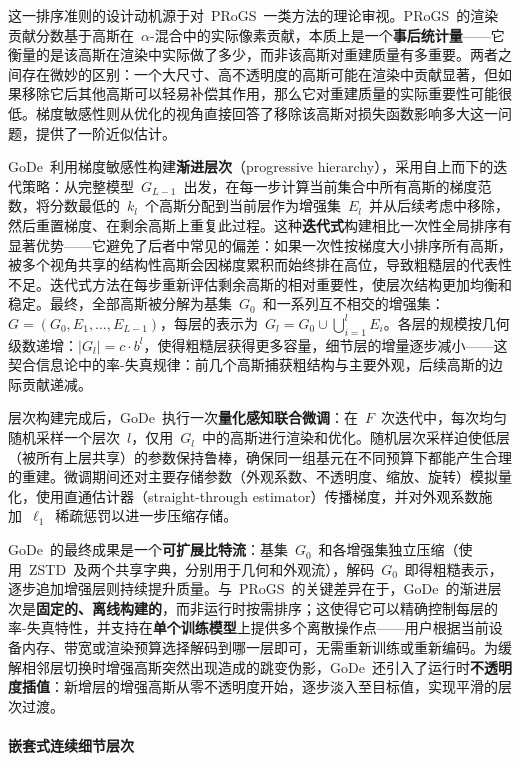 这一排序准则的设计动机源于对~PRoGS~一类方法的理论审视。PRoGS~的渲染贡献分数基于高斯在~$\alpha$-混合中的实际像素贡献，本质上是一个\textbf{事后统计量}——它衡量的是该高斯在渲染中实际做了多少，而非该高斯对重建质量有多重要。两者之间存在微妙的区别：一个大尺寸、高不透明度的高斯可能在渲染中贡献显著，但如果移除它后其他高斯可以轻易补偿其作用，那么它对重建质量的实际重要性可能很低。梯度敏感性则从优化的视角直接回答了移除该高斯对损失函数影响多大这一问题，提供了一阶近似估计。

GoDe~利用梯度敏感性构建\textbf{渐进层次}（progressive hierarchy），采用自上而下的迭代策略：从完整模型~$G_{L-1}$~出发，在每一步计算当前集合中所有高斯的梯度范数，将分数最低的~$k_l$~个高斯分配到当前层作为增强集~$E_l$~并从后续考虑中移除，然后重置梯度、在剩余高斯上重复此过程。这种\textbf{迭代式}构建相比一次性全局排序有显著优势——它避免了后者中常见的偏差：如果一次性按梯度大小排序所有高斯，被多个视角共享的结构性高斯会因梯度累积而始终排在高位，导致粗糙层的代表性不足。迭代式方法在每步重新评估剩余高斯的相对重要性，使层次结构更加均衡和稳定。最终，全部高斯被分解为基集~$G_0$~和一系列互不相交的增强集：$G = (G_0, E_1, \ldots, E_{L-1})$，每层的表示为~$G_l = G_0 \cup \bigcup_{i=1}^{l} E_i$。各层的规模按几何级数递增：$|G_l| = c \cdot b^l$，使得粗糙层获得更多容量，细节层的增量逐步减小——这契合信息论中的率-失真规律：前几个高斯捕获粗结构与主要外观，后续高斯的边际贡献递减。

层次构建完成后，GoDe~执行一次\textbf{量化感知联合微调}：在~$F$~次迭代中，每次均匀随机采样一个层次~$l$，仅用~$G_l$~中的高斯进行渲染和优化。随机层次采样迫使低层（被所有上层共享）的参数保持鲁棒，确保同一组基元在不同预算下都能产生合理的重建。微调期间还对主要存储参数（外观系数、不透明度、缩放、旋转）模拟量化，使用直通估计器（straight-through estimator）传播梯度，并对外观系数施加~$\ell_1$~稀疏惩罚以进一步压缩存储。

GoDe~的最终成果是一个\textbf{可扩展比特流}：基集~$G_0$~和各增强集独立压缩（使用~ZSTD~及两个共享字典，分别用于几何和外观流），解码~$G_0$~即得粗糙表示，逐步追加增强层则持续提升质量。与~PRoGS~的关键差异在于，GoDe~的渐进层次是\textbf{固定的、离线构建的}，而非运行时按需排序；这使得它可以精确控制每层的率-失真特性，并支持在\textbf{单个训练模型}上提供多个离散操作点——用户根据当前设备内存、带宽或渲染预算选择解码到哪一层即可，无需重新训练或重新编码。为缓解相邻层切换时增强高斯突然出现造成的跳变伪影，GoDe~还引入了运行时\textbf{不透明度插值}：新增层的增强高斯从零不透明度开始，逐步淡入至目标值，实现平滑的层次过渡。

\paragraph{嵌套式连续细节层次}


